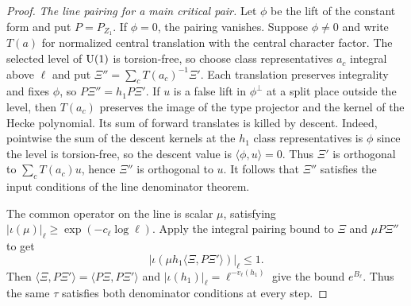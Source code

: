\begin{proof}
\emph{The line pairing for a main critical pair.}
Let $\phi$ be the lift of the constant form and put $P=P_{Z_1}$. If $\phi=0$, the pairing vanishes.
Suppose $\phi\ne0$ and write $T(a)$ for normalized central translation with the central character factor.
The selected level of $\operatorname{U}(1)$ is torsion-free, so choose class representatives $a_c$ integral above $\ell$ and put $\Xi''=\sum_c T(a_c)^{-1}\Xi'$.
Each translation preserves integrality and fixes $\phi$, so $P\Xi''=h_1P\Xi'$.
If $u$ is a false lift in $\phi^\perp$ at a split place outside the level, then $T(a_c)$ preserves the image of the type projector and the kernel of the Hecke polynomial. Its sum of forward translates is killed by descent. Indeed, pointwise the sum of the descent kernels at the $h_1$ class representatives is $\phi$ since the level is torsion-free, so the descent value is $\langle\phi,u\rangle=0$.
Thus $\Xi'$ is orthogonal to $\sum_c T(a_c)u$, hence $\Xi''$ is orthogonal to $u$. It follows that $\Xi''$ satisfies the input conditions of the line denominator theorem.

The common operator on the line is scalar $\mu$, satisfying $|\iota(\mu)|_\ell\ge\exp(-c_\ell\log\ell)$.
Apply the integral pairing bound to $\Xi$ and $\mu P\Xi''$ to get
\[
 |\iota(\mu h_1\langle\Xi,P\Xi'\rangle)|_\ell\le1 .
\]
Then $\langle\Xi,P\Xi'\rangle=\langle P\Xi,P\Xi'\rangle$ and $|\iota(h_1)|_\ell=\ell^{-v_\ell(h_1)}$ give the bound $e^{B_\ell}$.
Thus the same $\tau$ satisfies both denominator conditions at every step.
\end{proof}

